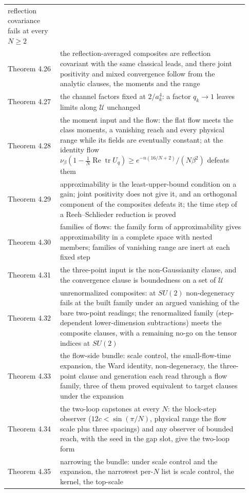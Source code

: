 \documentclass[10pt,letterpaper,twocolumn]{article}
\begin{document}
\begin{center}
{\begin{xtabular}{L{0.207\linewidth}L{0.724\linewidth}}
reflection covariance fails at every \(N\ge2\) \\
Theorem 4.26 & the reflection-averaged composites are reflection covariant with the
same classical leads, and there joint positivity and mixed convergence
follow from the analytic clauses, the moments and the range \\
Theorem 4.27 & the channel factors fixed at \(2/a_k^4\): a factor \(q_k\to1\) leaves
limits along \(\mathcal U\) unchanged \\
Theorem 4.28 & the moment input and the flow: the flat flow meets the class moments, a
vanishing reach and every physical range while its fields are eventually
constant; at the identity flow
\(\nu_\beta(1-\tfrac1N\operatorname{Re}\operatorname{tr}U_q)\ge e^{-n(16/N+2)}/(N\beta^2)\)
defeats them \\
Theorem 4.29 & approximability is the least-upper-bound condition on a gain; joint
positivity does not give it, and an orthogonal component of the
composites defeats it; the time step of a Reeh--Schlieder reduction is
proved \\
Theorem 4.30 & families of flows: the family form of approximability gives
approximability in a complete space with nested members; families of
vanishing range are inert at each fixed step \\
Theorem 4.31 & the three-point input is the non-Gaussianity clause, and the convergence
clause is boundedness on a set of \(\mathcal U\) \\
Theorem 4.32 & unrenormalized composites: at \(SU(2)\) non-degeneracy fails at the
built family under an argued vanishing of the bare two-point readings;
the renormalized family (step-dependent lower-dimension subtractions)
meets the composite clauses, with a remaining no-go on the tensor
indices at \(SU(2)\) \\
Theorem 4.33 & the flow-side bundle: scale control, the small-flow-time expansion, the
Ward identity, non-degeneracy, the three-point clause and generation
each read through a flow family, three of them proved equivalent to
target clauses under the expansion \\
Theorem 4.34 & the two-loop capstones at every \(N\): the block-step observer
(\(12c<\sin(\pi/N)\), physical range the flow scale plus three spacings)
and any observer of bounded reach, with the seed in the gap slot, give
the two-loop form \\
Theorem 4.35 & narrowing the bundle: under scale control and the expansion, the
narrowest per-\(N\) list is scale control, the kernel, the top-scale

\end{xtabular}}
\end{center}
\end{document}
